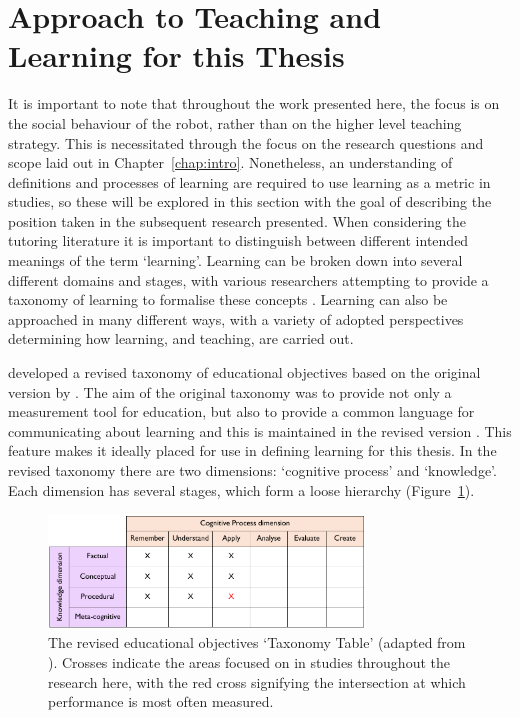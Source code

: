 \section{Approach to Teaching and Learning for this Thesis}\label{sec:background-learning}
It is important to note that throughout the work presented here, the focus is on the social behaviour of the robot, rather than on the higher level teaching strategy. This is necessitated through the focus on the research questions and scope laid out in Chapter~\ref{chap:intro}. Nonetheless, an understanding of definitions and processes of learning are required to use learning as a metric in studies, so these will be explored in this section with the goal of describing the position taken in the subsequent research presented. When considering the tutoring literature it is important to distinguish between different intended meanings of the term `learning'. Learning can be broken down into several different domains and stages, with various researchers attempting to provide a taxonomy of learning to formalise these concepts \citep{bloom1956taxonomy, krathwohl1964taxonomy}. Learning can also be approached in many different ways, with a variety of adopted perspectives determining how learning, and teaching, are carried out.

\cite{krathwohl2002revision} developed a revised taxonomy of educational objectives based on the original version by \cite{bloom1956taxonomy}. The aim of the original taxonomy was to provide not only a measurement tool for education, but also to provide a common language for communicating about learning and this is maintained in the revised version \cite{krathwohl2002revision}. This feature makes it ideally placed for use in defining learning for this thesis. In the revised taxonomy there are two dimensions: `cognitive process' and `knowledge'. Each dimension has several stages, which form a loose hierarchy (Figure~\ref{fig:learningtaxonomy}). 

\begin{figure}[ht]
    \centering
    \includegraphics[width=0.75\textwidth]{images/ch2_LearningTaxonomy.pdf}
    \caption{The revised educational objectives `Taxonomy Table' (adapted from \citealp{krathwohl2002revision}). Crosses indicate the areas focused on in studies throughout the research here, with the red cross signifying the intersection at which performance is most often measured.}
    \label{fig:learningtaxonomy}
\end{figure}

